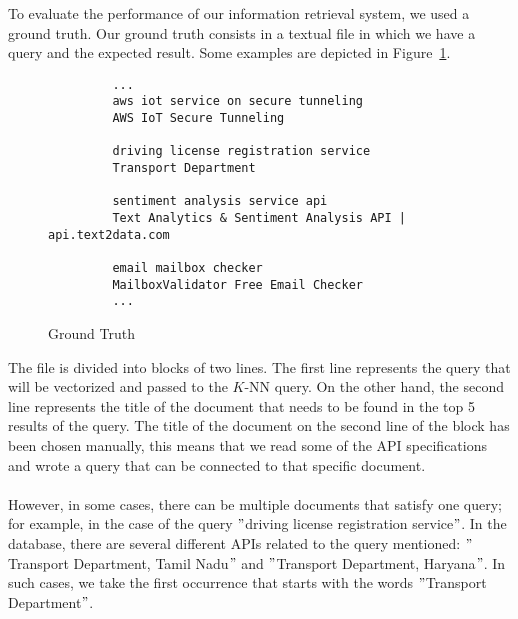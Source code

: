 To evaluate the performance of our information retrieval system, we used a ground truth.
Our ground truth consists in a textual file in which we have a query and the expected result.
Some examples are depicted in Figure~\ref{fig:ground-truth}.
\begin{figure}
    \centering
    \begin{verbatim}
         ...
         aws iot service on secure tunneling
         AWS IoT Secure Tunneling

         driving license registration service
         Transport Department

         sentiment analysis service api
         Text Analytics & Sentiment Analysis API | api.text2data.com

         email mailbox checker
         MailboxValidator Free Email Checker
         ...
    \end{verbatim}
    \caption{Ground Truth}
    \label{fig:ground-truth}
\end{figure}
The file is divided into blocks of two lines.
The first line represents the query that will be vectorized and passed to the $K$-NN query.
On the other hand, the second line represents the title of the document that needs to be found in the top 5 results of the query.
The title of the document on the second line of the block has been chosen manually, this means that we read some of the API specifications and wrote a query that can be connected to that specific document. \\ \\
However, in some cases, there can be multiple documents that satisfy one query; for example, in the case of the query \("\)driving license registration service\("\).
In the database, there are several different APIs related to the query mentioned: \("\)Transport Department, Tamil Nadu\("\) and \("\)Transport Department, Haryana\("\).
In such cases, we take the first occurrence that starts with the words \("\)Transport Department\("\).
